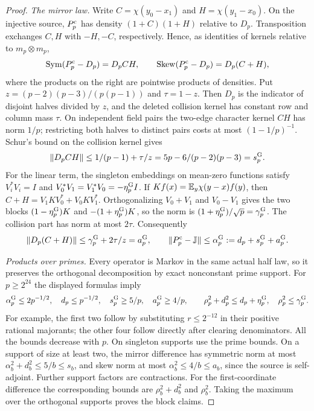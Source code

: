 \begin{proof}
\emph{The mirror law.}
Write $C=\chi(y_0-x_1)$ and $H=\chi(y_1-x_0)$. On the injective source,
$P_p^{\rm c}$ has density $(1+C)(1+H)$ relative to $D_p$.
Transposition exchanges $C,H$ with $-H,-C$, respectively. Hence, as
identities of kernels relative to $m_p\otimes m_p$,
\begin{equation}\label{eq:merge:mirror-identities}
 \operatorname{Sym}(P_p^{\rm c}-D_p)=D_pCH,\qquad
 \operatorname{Skew}(P_p^{\rm c}-D_p)=D_p(C+H),
\end{equation}
where the products on the right are pointwise products of densities.
Put $z=(p-2)(p-3)/(p(p-1))$ and $\tau=1-z$. Then $D_p$ is the
indicator of disjoint halves divided by $z$, and the deleted collision
kernel has constant row and column mass $\tau$. On independent field
pairs the two-edge character kernel $CH$ has norm $1/p$; restricting
both halves to distinct pairs costs at most $(1-1/p)^{-1}$. Schur's
bound on the collision kernel gives
\[
 \|D_pCH\|\le\frac{1/(p-1)+\tau}{z}
 =\frac{5p-6}{(p-2)(p-3)}=s^{\rm G}_p.
\]
For the linear term, the singleton embeddings on mean-zero functions
satisfy $V_i^*V_i=I$ and $V_0^*V_1=V_1^*V_0=-\eta^{\rm G}_p I$.
If $Kf(x)=\E_y\chi(y-x)f(y)$, then
$C+H=V_1KV_0^*+V_0KV_1^*$. Orthogonalizing $V_0+V_1$ and
$V_0-V_1$ gives the two blocks $(1-\eta^{\rm G}_p)K$ and
$-(1+\eta^{\rm G}_p)K$, so the norm is $(1+\eta^{\rm G}_p)/\sqrt p=\gamma^{\rm G}_p$.
The collision part has norm at most $2\tau$. Consequently
\[
 \|D_p(C+H)\|\le\frac{\gamma^{\rm G}_p+2\tau}{z}=a^{\rm G}_p,
 \qquad \|P_p^{\rm c}-\Jproj\|\le\alpha^{\rm G}_p:=d_p+s^{\rm G}_p+a^{\rm G}_p.
\]

\emph{Products over primes.}
Every operator is Markov in the same actual half law, so it preserves
the orthogonal decomposition by exact nonconstant prime support.
For $p\ge2^{24}$ the displayed formulas imply
\[
 \alpha^{\rm G}_p\le2p^{-1/2},\quad d_p\le p^{-1/2},\quad
 s^{\rm G}_p\ge5/p,\quad a^{\rm G}_p\ge4/p,
 \qquad \rho_p^2+d_p^2\le d_p+\eta^{\rm G}_p,\quad
 \rho_p^2\le\gamma^{\rm G}_p.
\]
For example, the first two follow by substituting
$r\le2^{-12}$ in their positive rational majorants; the other four
follow directly after clearing denominators. All the bounds decrease
with $p$. On singleton supports use the prime bounds. On a support of
size at least two, the mirror difference has symmetric norm at most
$\alpha_b^2+d_b^2\le5/b\le s_b$, and skew norm at most
$\alpha_b^2\le4/b\le a_b$, since the source is self-adjoint. Further
support factors are contractions. For the first-coordinate difference
the corresponding bounds are $\rho_b^2+d_b^2$ and $\rho_b^2$.
Taking the maximum over the orthogonal supports proves the block claims.
\end{proof}

